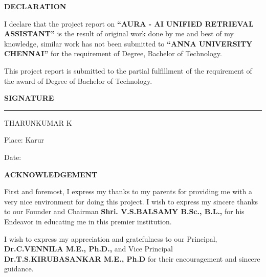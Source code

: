\documentclass[12pt,a4paper]{report}
\begin{document}

\begin{center}
{\bfseries\Large DECLARATION}
\end{center}

\vspace{1cm}

\noindent
I declare that the project report on
\textbf{``AURA - AI UNIFIED RETRIEVAL ASSISTANT''}
is the result of original work done by me and best of my knowledge,
similar work has not been submitted to
\textbf{``ANNA UNIVERSITY CHENNAI''}
for the requirement of Degree,
Bachelor of Technology.

\vspace{0.5cm}
\noindent
This project report is submitted to the partial fulfillment of the requirement
of the award of Degree of Bachelor of Technology.

\vspace{3cm}

\begin{flushright}
\textbf{SIGNATURE}

\vspace{1.5cm}

\rule{4cm}{0.4pt}

THARUNKUMAR K
\end{flushright}

\vspace{2cm}

\noindent
Place: Karur

\noindent
Date:

\clearpage


\begin{center}
{\bfseries\Large ACKNOWLEDGEMENT}
\end{center}

\vspace{0.8cm}

\noindent
First and foremost, I express my thanks to my parents for providing me with a
very nice environment for doing this project. I wish to express my sincere thanks to our Founder and Chairman \textbf{Shri. V.S.BALSAMY B.Sc., B.L.,} for his Endeavor in educating me in this premier institution.

\vspace{0.5cm}
\noindent
I wish to express my appreciation and gratefulness to our Principal,
\textbf{Dr.C.VENNILA M.E., Ph.D.,} and Vice Principal \textbf{Dr.T.S.KIRUBASANKAR M.E., Ph.D} for their encouragement and sincere guidance.
\end{document}
